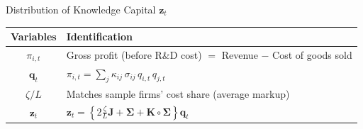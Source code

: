 \documentclass[
  10pt,               %
  aspectratio=169,    %
  handout             %
]{beamer}
\theoremstyle{plain}
\begin{document}
%
\begin{frame}{Distribution of Knowledge Capital $\bm{z}_t$}
  \begin{table}[htbp]
    \centering
    \begin{tabular}{cl}
      \toprule
     Variables & Identification \\
      \midrule
      $\pi_{i,t}$ 
        & Gross profit (before R\&D cost) 
          $=$ Revenue $-$ Cost of goods sold \\[6pt]
      $\bm{q}_t$
        &
          $\pi_{i,t}=\displaystyle\sum_{j}\kappa_{ij}\,\sigma_{ij}\,q_{i,t}\,q_{j,t}$ \\[6pt]
      $\zeta/L$
        & Matches sample firms’ cost share (average markup) \\[6pt]
      $\bm{z}_t$
        &
          $\displaystyle \bm{z}_{t}
           =\left\{2\frac{\zeta}{L}\bm{J}+\bm{\Sigma}+\bm{K}\circ\bm{\Sigma}\right\}\bm{q}_{t}$ \\
      \bottomrule
    \end{tabular}
  \end{table}
\end{frame}
%
\end{document}
